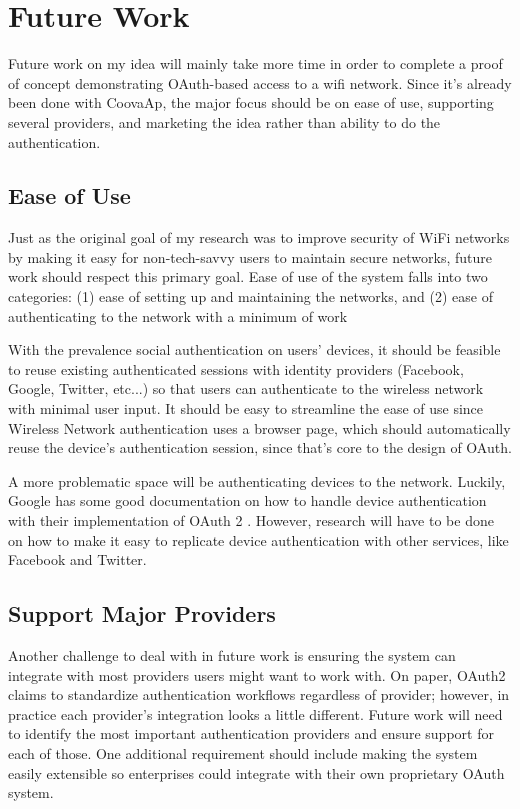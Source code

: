 \section{Future Work}
\label{section:futurework}
Future work on my idea will mainly take more time in order to complete a proof of concept
demonstrating OAuth-based access to a wifi network. Since it's already been done with CoovaAp, the
major focus should be on ease of use, supporting several providers, and marketing the idea rather
than ability to do the authentication.

\subsection{Ease of Use}
Just as the original goal of my research was to improve security of WiFi networks by making it easy
for non-tech-savvy users to maintain secure networks, future work should respect this primary goal.
Ease of use of the system falls into two categories: (1) ease of setting up and maintaining the
networks, and (2) ease of authenticating to the network with a minimum of work

With the prevalence social authentication on users' devices, it should be feasible to reuse existing
authenticated sessions with identity providers (Facebook, Google, Twitter, etc...) so that users can
authenticate to the wireless network with minimal user input. It should be easy to streamline the
ease of use since Wireless Network authentication uses a browser page, which should automatically
reuse the device's authentication session, since that's core to the design of OAuth.

A more problematic space will be authenticating devices to the network. Luckily, Google has some
good documentation on how to handle device authentication with their implementation of OAuth 2
\cite{google:OAuthDevices}. However, research will have to be done on how to make it easy to
replicate device authentication with other services, like Facebook and Twitter.

\subsection{Support Major Providers}
Another challenge to deal with in future work is ensuring the system can integrate with most
providers users might want to work with. On paper, OAuth2 claims to standardize authentication
workflows regardless of provider; however, in practice each provider's integration looks a little
different. Future work will need to identify the most important authentication providers and ensure
support for each of those. One additional requirement should include making the system easily
extensible so enterprises could integrate with their own proprietary OAuth system.

